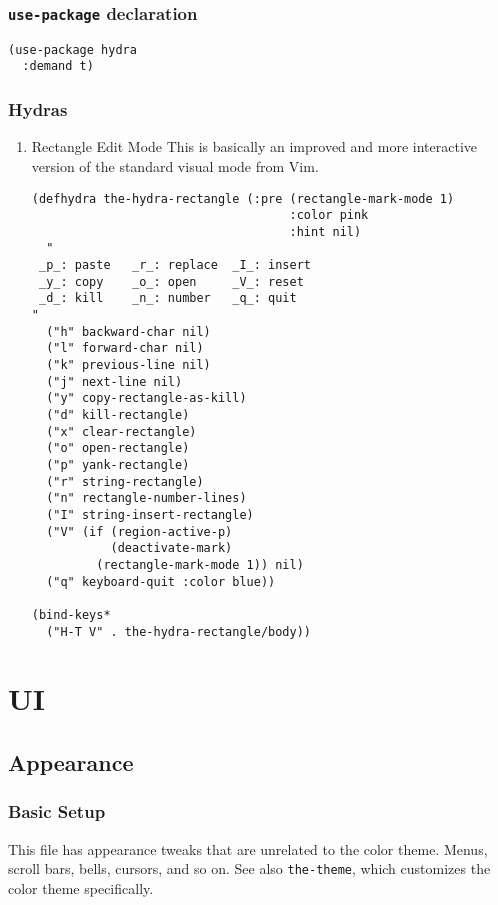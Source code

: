 \documentclass[11pt]{article}
\begin{document}
\subsubsection{\texttt{use-package} declaration}
\label{sec:org3f4f8a1}
\begin{verbatim}
(use-package hydra
  :demand t)
\end{verbatim}

\subsubsection{Hydras}
\label{sec:orgd5e175a}

\begin{enumerate}
\item Rectangle Edit Mode
\label{sec:org7ce5c8b}
This is basically an improved and more interactive version of the
standard visual mode from Vim.

\begin{verbatim}
(defhydra the-hydra-rectangle (:pre (rectangle-mark-mode 1)
                                    :color pink
                                    :hint nil)
  "
 _p_: paste   _r_: replace  _I_: insert
 _y_: copy    _o_: open     _V_: reset
 _d_: kill    _n_: number   _q_: quit
"
  ("h" backward-char nil)
  ("l" forward-char nil)
  ("k" previous-line nil)
  ("j" next-line nil)
  ("y" copy-rectangle-as-kill)
  ("d" kill-rectangle)
  ("x" clear-rectangle)
  ("o" open-rectangle)
  ("p" yank-rectangle)
  ("r" string-rectangle)
  ("n" rectangle-number-lines)
  ("I" string-insert-rectangle)
  ("V" (if (region-active-p)
           (deactivate-mark)
         (rectangle-mark-mode 1)) nil)
  ("q" keyboard-quit :color blue))

(bind-keys*
  ("H-T V" . the-hydra-rectangle/body))
\end{verbatim}
\end{enumerate}
\section{UI}
\label{sec:org9e23c8a}
\subsection{Appearance}
\label{sec:orgac48657}
\subsubsection{Basic Setup}
\label{sec:org3cc21a1}
This file has appearance tweaks that are unrelated to the color
theme. Menus, scroll bars, bells, cursors, and so on. See also
\texttt{the-theme}, which customizes the color theme specifically.
\end{document}
